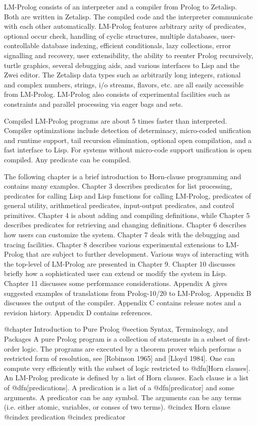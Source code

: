 {LM-Prolog consists of an interpreter and a compiler from Prolog to Zetalisp.
Both are written in Zetalisp.
The compiled code and the interpreter
communicate with each other automatically.
LM-Prolog features arbitrary arity of predicates,
optional occur check,
handling of cyclic structures, multiple databases, user-controllable
database indexing, efficient conditionals, lazy collections, 
error signalling and recovery, user extensibility,
the ability to reenter Prolog recursively,
turtle graphics, several debugging aids, and various interfaces to Lisp
and the Zwei editor.
The Zetalisp data types such as arbitrarily long integers, rational
and complex numbers, strings, i/o streams, flavors, etc. 
are all easily accessible from LM-Prolog.
LM-Prolog also consists of experimental
facilities such as constraints
and parallel processing via eager bags and sets.

Compiled LM-Prolog programs are about 5 times faster than interpreted. 
Compiler optimizations
include detection of determinacy,  micro-coded unification and
runtime support, tail recursion elimination,
optional open compilation, and a fast interface to Lisp.
For systems without micro-code support unification is open compiled.
Any predicate can be compiled.

The following chapter is a brief introduction to Horn-clause
programming and contains many examples.  Chapter 3 describes
predicates for list processing, predicates for calling Lisp and Lisp
functions for calling LM-Prolog, predicates of general utility,
arithmetical predicates, input-output predicates, and control
primitives.  Chapter 4 is about adding and compiling definitions,
while Chapter 5 describes predicates for retrieving and changing
definitions.  Chapter 6 describes how users can customize the system.
Chapter 7 deals with the debugging and tracing facilities.  Chapter 8
describes various experimental extensions to LM-Prolog that are
subject to further development.  Various ways of interacting with the
top-level of LM-Prolog are presented in Chapter 9.  Chapter 10
discusses briefly how a sophisticated user can extend or modify the
system in Lisp.  Chapter 11 discusses some performance considerations.
Appendix A gives suggested examples of translations from Prolog-10/20
to LM-Prolog.  Appendix B discusses the output of the compiler.
Appendix C contains release notes and a revision history.  Appendix D
contains references.

@chapter Introduction to Pure Prolog
@section Syntax, Terminology, and Packages
A pure Prolog program is a collection of statements in a subset of 
first-order logic.
The programs are executed by a theorem prover which performs a restricted
form of resolution, see [Robinson 1965] and [Lloyd 1984].
One can compute very efficiently with the subset of logic restricted to 
@dfn[Horn clauses].
An LM-Prolog predicate is defined by a list of Horn clauses.
Each clause is a list of @dfn[predications].
A predication is a list of a @dfn[predicator] and some arguments.
A predicator can be any symbol.
The arguments can be any terms (i.e. either atomic, variables, or conses of
two terms).
@cindex Horn clause
@cindex predication
@cindex predicator

}
